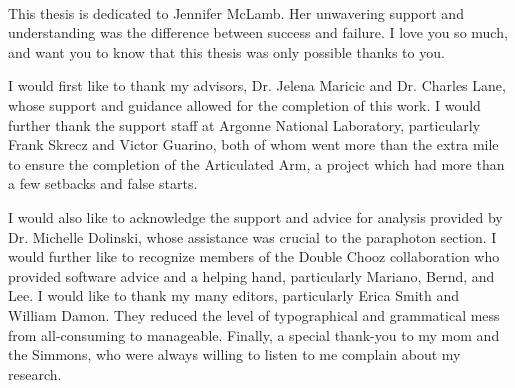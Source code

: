 \begin{preamble}

\iffinal{}{\newpage}
\begin{DUTdedications}
%
\vspace*{\fill}
%
\begin{center}
\begin{minipage}{8 cm}
\begin{center}
\hrulefill\\
This thesis is dedicated to Jennifer McLamb. Her unwavering support and understanding was the difference between success and failure. I love you so much, and want you to know that this thesis was only possible thanks to you. 

\hrulefill
\vspace{6em}
\end{center}
\end{minipage}
\end{center} 
%
\vspace*{\fill}
%
\end{DUTdedications} 
\iffinal{}{\newpage}

\begin{acknowledgments}
 I would first like to thank my advisors, Dr. Jelena Maricic and Dr. Charles Lane, whose support and guidance allowed for the completion of this work. I would further thank the support staff at Argonne National Laboratory, particularly Frank Skrecz and Victor Guarino, both of whom went more than the extra mile to ensure the completion of the Articulated Arm, a project which had more than a few setbacks and false starts. 

I would also like to acknowledge the support and advice for analysis provided by Dr. Michelle Dolinski, whose assistance was crucial to the paraphoton section. I would further like to recognize members of the Double Chooz collaboration who provided software advice and a helping hand, particularly Mariano, Bernd, and Lee. I would like to thank my many editors, particularly Erica Smith and William Damon. They reduced the level of typographical and grammatical mess from all-consuming to manageable. Finally, a special thank-you to my mom and the Simmons, who were always willing to listen to me complain about my research. 
 
  \end{acknowledgments}
  \iffinal{}{\newpage}


\end{preamble}

